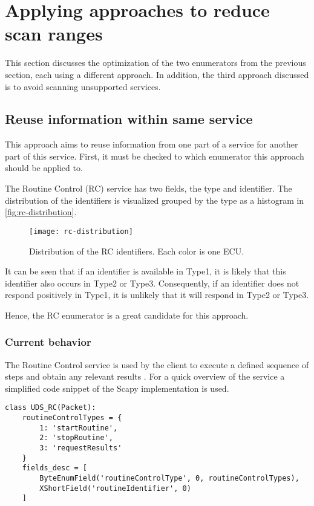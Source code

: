\section{Applying approaches to reduce scan ranges}

This section discusses the optimization of the two enumerators from the previous section, each using a different approach. In addition, the third approach discussed is to avoid scanning unsupported services. 

\subsection{Reuse information within same service}

This approach aims to reuse information from one part of a service for another part of this service. First, it must be checked to which enumerator this approach should be applied to.

The Routine Control (RC) service has two fields, the type and identifier. The distribution of the identifiers is visualized grouped by the type as a histogram in \autoref{fig:rc-distribution}.

\begin{figure}[h]
    \centering
    \texttt{[image: rc-distribution]}
    \caption{Distribution of the RC identifiers. Each color is one ECU.}
    \label{fig:rc-distribution}
\end{figure}

It can be seen that if an identifier is available in Type1, it is likely that this identifier also occurs in Type2 or Type3. Consequently, if an identifier does not respond positively in Type1, it is unlikely that it will respond in Type2 or Type3.

Hence, the RC enumerator is a great candidate for this approach.

\subsubsection{Current behavior}

The Routine Control service is used by the client to execute a defined sequence of steps and obtain any relevant results \cite{iso14229}. For a quick overview of the service a simplified code snippet of the Scapy implementation is used.

\begin{samepage}
\begin{verbatim}
class UDS_RC(Packet):
    routineControlTypes = {
        1: 'startRoutine',
        2: 'stopRoutine',
        3: 'requestResults'
    }
    fields_desc = [
        ByteEnumField('routineControlType', 0, routineControlTypes),
        XShortField('routineIdentifier', 0)
    ]
\end{verbatim}
\end{samepage}

